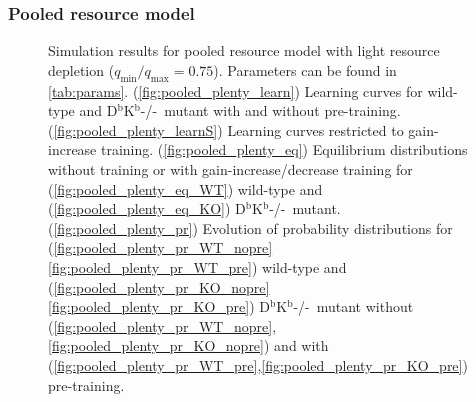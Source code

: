 \documentclass[12pt]{article}
\newcommand{\KO}{D$^\mathrm{b}$K$^\mathrm{b}$-/-}
\newcommand{\lmax}{_{\text{max}}}
\newcommand{\lmin}{_{\text{min}}}
\begin{document}
\subsubsection{Pooled resource model}\label{sec:pooled}

\begin{figure}
 \begin{center}
 \begin{myenuma}
  \item{}\label{fig:pooled_plenty_learn}
  \item{}\label{fig:pooled_plenty_learnS}
  \item\label{fig:pooled_plenty_eq}\begin{myenumi}
                    \item{}\label{fig:pooled_plenty_eq_WT}
                    \item{}\label{fig:pooled_plenty_eq_KO}
                  \end{myenumi}
  \item\label{fig:pooled_plenty_pr}\begin{myenumi}
                    \item{}\label{fig:pooled_plenty_pr_WT_nopre}
                    \item{}\label{fig:pooled_plenty_pr_WT_pre}
                    \item{}\label{fig:pooled_plenty_pr_KO_nopre}
                    \item{}\label{fig:pooled_plenty_pr_KO_pre}
                  \end{myenumi}
 \end{myenuma}
 \end{center}
  \caption{Simulation results for pooled resource model with light resource depletion ($q\lmin/q\lmax=0.75$).
  Parameters can be found in \autoref{tab:params}.
  (\ref{fig:pooled_plenty_learn}) Learning curves for wild-type and \KO\ mutant with and without pre-training.
  (\ref{fig:pooled_plenty_learnS}) Learning curves restricted to gain-increase training.
  (\ref{fig:pooled_plenty_eq}) Equilibrium distributions without training or with gain-increase/decrease training for (\ref{fig:pooled_plenty_eq_WT}) wild-type and (\ref{fig:pooled_plenty_eq_KO}) \KO\ mutant.
  (\ref{fig:pooled_plenty_pr}) Evolution of probability distributions for (\ref{fig:pooled_plenty_pr_WT_nopre}\ref{fig:pooled_plenty_pr_WT_pre}) wild-type and  (\ref{fig:pooled_plenty_pr_KO_nopre}\ref{fig:pooled_plenty_pr_KO_pre}) \KO\ mutant without (\ref{fig:pooled_plenty_pr_WT_nopre},\ref{fig:pooled_plenty_pr_KO_nopre}) and with (\ref{fig:pooled_plenty_pr_WT_pre},\ref{fig:pooled_plenty_pr_KO_pre}) pre-training. } \label{fig:pooled_plenty}
\end{figure}
\end{document}
